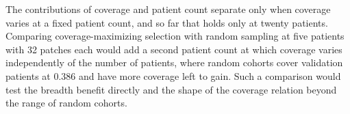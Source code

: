 The contributions of coverage and patient count separate only when coverage varies at a fixed patient count, and so far that holds only at twenty patients. Comparing coverage-maximizing selection with random sampling at five patients with 32 patches each would add a second patient count at which coverage varies independently of the number of patients, where random cohorts cover validation patients at 0.386 and have more coverage left to gain. Such a comparison would test the breadth benefit directly and the shape of the coverage relation beyond the range of random cohorts.
